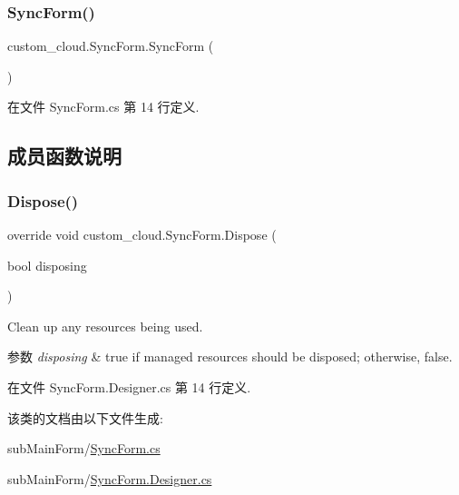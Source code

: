\subsubsection{\texorpdfstring{Sync\+Form()}{SyncForm()}}
{\footnotesize\ttfamily custom\+\_\+cloud.\+Sync\+Form.\+Sync\+Form (\begin{DoxyParamCaption}{ }\end{DoxyParamCaption})}



在文件 Sync\+Form.\+cs 第 14 行定义.



\subsection{成员函数说明}
\mbox{\label{classcustom__cloud_1_1_sync_form_ad01e9fc54fbb324bbb83babcaee429ff}} 
\subsubsection{\texorpdfstring{Dispose()}{Dispose()}}
{\footnotesize\ttfamily override void custom\+\_\+cloud.\+Sync\+Form.\+Dispose (\begin{DoxyParamCaption}\item[{bool}]{disposing }\end{DoxyParamCaption})\hspace{0.3cm}{\ttfamily [protected]}}



Clean up any resources being used. 


\begin{DoxyParams}{参数}
{\em disposing} & true if managed resources should be disposed; otherwise, false.\\
\hline
\end{DoxyParams}


在文件 Sync\+Form.\+Designer.\+cs 第 14 行定义.



该类的文档由以下文件生成\+:\begin{DoxyCompactItemize}
\item 
sub\+Main\+Form/\hyperlink{_sync_form_8cs}{Sync\+Form.\+cs}\item 
sub\+Main\+Form/\hyperlink{_sync_form_8_designer_8cs}{Sync\+Form.\+Designer.\+cs}\end{DoxyCompactItemize}
